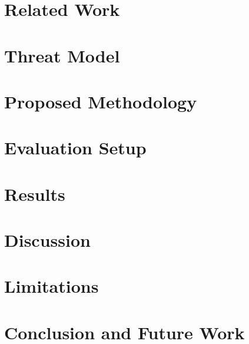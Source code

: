 \documentclass[conference]{IEEEtran}
\begin{document}

\section{Related Work}

\section{Threat Model}

\section{Proposed Methodology}

\section{Evaluation Setup}

\section{Results}

\section{Discussion}

\section{Limitations}

\section{Conclusion and Future Work}



\end{document}
